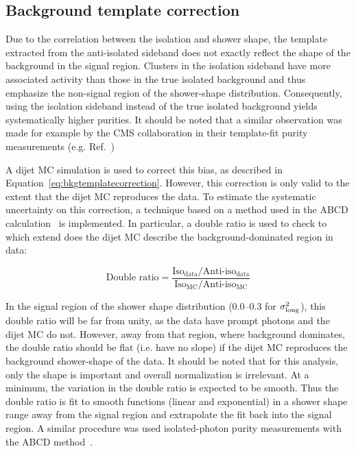 \subsection{Background template correction}
\label{sec:bkgtemplatecorrection}
Due to the correlation between the isolation and shower shape, the template extracted from the anti-isolated sideband does not exactly reflect the shape of the background in the signal region. Clusters in the isolation sideband have more associated activity than those in the true isolated background and thus emphasize the non-signal region of the shower-shape distribution. Consequently, using the isolation sideband instead of the true isolated background yields systematically higher purities. It should be noted that a similar observation was made for example by the CMS collaboration in their template-fit purity measurements (e.g. Ref.~\cite{Sirunyan:2017qhf})

A dijet MC simulation is used to correct this bias, as described in Equation~\ref{eq:bkgtemplatecorrection}. However, this correction is only valid to the extent that the dijet MC reproduces the data. To estimate the systematic uncertainty on this correction, a technique based on a method used in the ABCD calculation~\cite{Erwann} is implemented. In particular, a double ratio is used to check to which extend does the dijet MC describe the background-dominated region in data: 

\begin{equation}
    \text{Double ratio} = \frac{\text{Iso}_{\text{data}}/\text{Anti-iso}_{\text{data}}}{\text{Iso}_{\text{MC}}/\text{Anti-iso}_{\text{MC}}}
    \label{eq:bkgtemplatedoubleratio}
\end{equation}

In the signal region of the shower shape distribution (0.0--0.3 for $\sigma^{2}_{\mathrm{long}}$), this double ratio will be far from unity, as the data have prompt photons and the dijet MC do not. However, away from that region, where background dominates, the double ratio should be flat (i.e. have no slope) if the dijet MC reproduces the background shower-shape of the data. It should be noted that for this analysis, only the shape is important and overall normalization is irrelevant. At a minimum, the variation in the double ratio is expected to be smooth. Thus the double ratio is fit to smooth functions (linear and exponential) in a shower shape range away from the signal region and extrapolate the fit back into the signal region. A similar procedure was used isolated-photon purity measurements with the ABCD method~\cite{Acharya:2019jkx,Erwann}.


